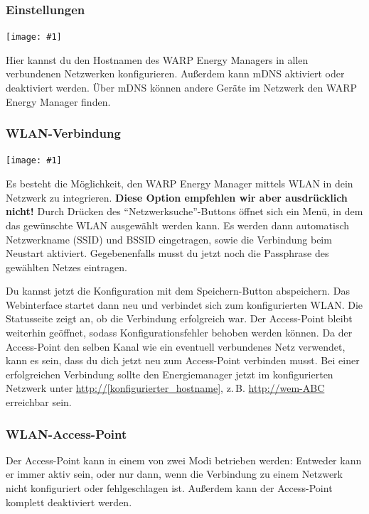 \documentclass[a4paper,10pt]{article}
\newcommand{\gfx}[1]{\texttt{[image: \#1]}}
\begin{document}
\begin{multicols*}{2}
	\subsubsection{Einstellungen}

	\gfx{./img/resized/web_network}

	Hier kannst du den Hostnamen des WARP Energy Managers in allen verbundenen Netzwerken konfigurieren. Außerdem kann mDNS aktiviert oder deaktiviert werden.
	Über mDNS können andere Geräte im Netzwerk den WARP Energy Manager finden.


	\subsubsection{WLAN-Verbindung}
	\gfx{./img/resized/web_wifi_sta}

	Es besteht die Möglichkeit, den WARP Energy Manager mittels WLAN in dein Netzwerk
	zu integrieren. \textbf{Diese Option empfehlen wir aber ausdrücklich
	nicht!}
	Durch Drücken des \enquote{Netzwerksuche}-Buttons öffnet sich ein Menü, in dem das gewünschte WLAN ausgewählt werden kann.
	Es werden dann automatisch Netzwerkname (SSID) und BSSID eingetragen, sowie die Verbindung beim Neustart aktiviert.
	Gegebenenfalls musst du jetzt noch die Passphrase des gewählten Netzes eintragen.

	Du kannst jetzt die Konfiguration mit dem Speichern-Button abspeichern.
	Das Webinterface startet dann neu und verbindet sich zum konfigurierten WLAN. Die Statusseite zeigt
	an, ob die Verbindung erfolgreich war. Der Access-Point bleibt weiterhin
	geöffnet, sodass Konfigurationsfehler behoben werden können.
	Da der Access-Point den selben Kanal wie ein eventuell verbundenes Netz verwendet,
	kann es sein, dass du dich jetzt neu zum Access-Point verbinden musst. Bei einer erfolgreichen Verbindung sollte den Energiemanager jetzt im konfigurierten Netzwerk unter
	\url{http://[konfigurierter_hostname]}, z.\,B. \url{http://wem-ABC} erreichbar sein.

	\subsubsection{WLAN-Access-Point}

	Der Access-Point kann in einem von zwei Modi betrieben werden: Entweder kann er immer aktiv sein,
	oder nur dann, wenn die Verbindung zu einem Netzwerk nicht konfiguriert oder fehlgeschlagen ist.
	Außerdem kann der Access-Point komplett deaktiviert werden.


\end{multicols*}
\end{document}
